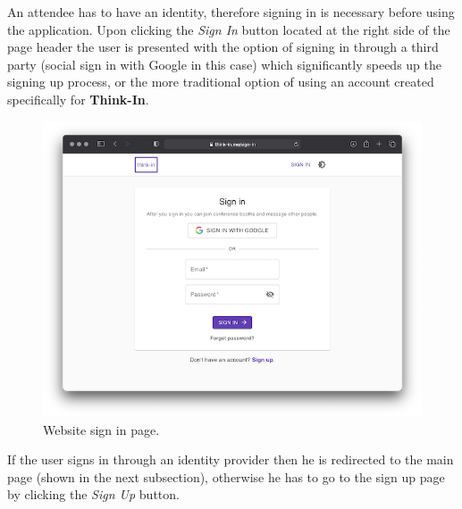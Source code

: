 An attendee has to have an identity, therefore signing in is necessary before using the application. Upon clicking the \textit{Sign In} button located at the right side of the page header the user is presented with the option of signing in through a third party (social sign in with Google in this case) which significantly speeds up the signing up process, or the more traditional option of using an account created specifically for \textbf{Think-In}.

\begin{figure}[H]
	\includegraphics[width=\textwidth,keepaspectratio]{images/business_logic/sign_in_page.png}
	\caption{Website sign in page.}
	\label{figure:website-sign-in-page}
\end{figure}

If the user signs in through an identity provider then he is redirected to the main page (shown in the next subsection), otherwise he has to go to the sign up page by clicking the \textit{Sign Up} button.

